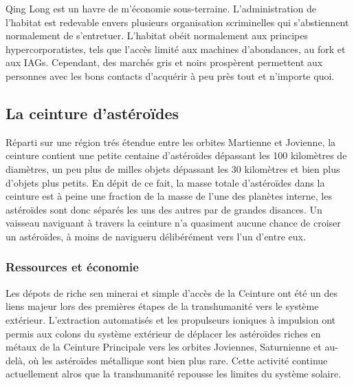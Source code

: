                                                                Qing Long est un havre de m'économie sous-terraine. L'administration de l'habitat est redevable envers plusieurs organisation scriminelles qui s'abstiennent normalement de s'entretuer. L'habitat obéit normalement aux principes hypercorporatistes, tels que l'accès limité aux machines d'abondances, au fork et aux IAGs. Cependant, des marchés gris et noirs prospèrent permettent aux personnes avec les bons contacts d'acquérir à peu près tout et n'importe quoi. 

                                                               \subsection{La ceinture d'astéroïdes} \label{sec:asteroid-belt} 

                                                               Réparti sur une région trés étendue entre les orbites Martienne et Jovienne, la ceinture contient une petite centaine d'astéroïdes dépassant les 100 kilomètres de diamètres, un peu plus de milles objets dépassant les 30 kilomètres et bien plus d'objets plus petits. En dépit de ce fait, la masse totale d'astéroïdes dans la ceinture est à peine une fraction de la masse de l'une des planètes interne, les astéroïdes sont donc séparés les uns des autres par de grandes disances. Un vaisseau naviguant à travers la ceinture n'a quasiment aucune chance de croiser un astéroïdes, à moins de navigueru délibérément vers l'un d'entre eux. 

                                                               \subsubsection{Ressources et économie} \label{sec:asteroid-resources-economics} 

                                                               Les dépots de riche sen minerai et simple d'accès de la Ceinture ont été un des liens majeur lors des premières étapes de la transhumanité vers le système extérieur. L'extraction automatisés et les propulseurs ioniques à impulsion ont permis aux colons du système extérieur de déplacer les astéroïdes riches en métaux de la Ceinture Principale vers les orbites Joviennes, Saturnienne et au-delà, où les astéroïdes métallique sont bien plus rare. Cette activité continue actuellement alros que la transhumanité repousse les limites du système solaire. 

